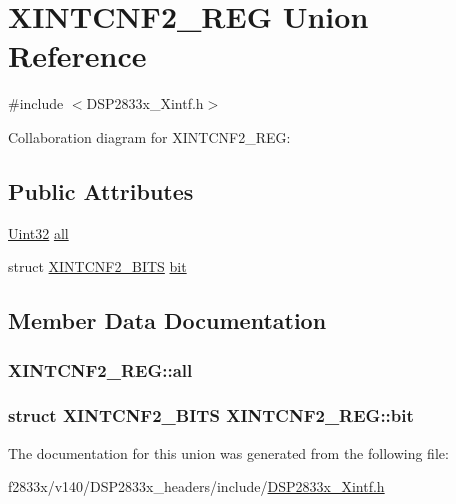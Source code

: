 \hypertarget{union_x_i_n_t_c_n_f2___r_e_g}{}\section{X\+I\+N\+T\+C\+N\+F2\+\_\+\+R\+E\+G Union Reference}
\label{union_x_i_n_t_c_n_f2___r_e_g}


{\ttfamily \#include $<$D\+S\+P2833x\+\_\+\+Xintf.\+h$>$}



Collaboration diagram for X\+I\+N\+T\+C\+N\+F2\+\_\+\+R\+E\+G\+:
\subsection*{Public Attributes}
\begin{DoxyCompactItemize}
\item 
\hyperlink{_d_s_p2833x___device_8h_aba99025e657f892beb7ff31cecf64653}{Uint32} \hyperlink{union_x_i_n_t_c_n_f2___r_e_g_a1ec5b07bcf6de0b4af7f8a524d0a0709}{all}
\item 
struct \hyperlink{struct_x_i_n_t_c_n_f2___b_i_t_s}{X\+I\+N\+T\+C\+N\+F2\+\_\+\+B\+I\+T\+S} \hyperlink{union_x_i_n_t_c_n_f2___r_e_g_af52a04cfc3f0d13073d5c7c4e1e9aa4e}{bit}
\end{DoxyCompactItemize}


\subsection{Member Data Documentation}
\hypertarget{union_x_i_n_t_c_n_f2___r_e_g_a1ec5b07bcf6de0b4af7f8a524d0a0709}{}
\subsubsection[{all}]{ X\+I\+N\+T\+C\+N\+F2\+\_\+\+R\+E\+G\+::all}\label{union_x_i_n_t_c_n_f2___r_e_g_a1ec5b07bcf6de0b4af7f8a524d0a0709}
\hypertarget{union_x_i_n_t_c_n_f2___r_e_g_af52a04cfc3f0d13073d5c7c4e1e9aa4e}{}
\subsubsection[{bit}]{\setlength{\rightskip}{0pt plus 5cm}struct {\bf X\+I\+N\+T\+C\+N\+F2\+\_\+\+B\+I\+T\+S} X\+I\+N\+T\+C\+N\+F2\+\_\+\+R\+E\+G\+::bit}\label{union_x_i_n_t_c_n_f2___r_e_g_af52a04cfc3f0d13073d5c7c4e1e9aa4e}


The documentation for this union was generated from the following file\+:\begin{DoxyCompactItemize}
\item 
f2833x/v140/\+D\+S\+P2833x\+\_\+headers/include/\hyperlink{_d_s_p2833x___xintf_8h}{D\+S\+P2833x\+\_\+\+Xintf.\+h}\end{DoxyCompactItemize}
